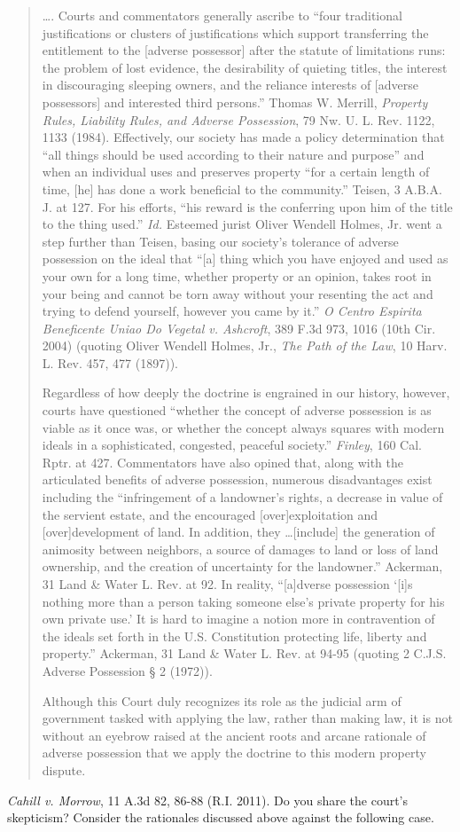 \begin{quotation}
\ldots. Courts and commentators generally ascribe to ``four traditional
justifications or clusters of justifications which support transferring the
entitlement to the [adverse possessor] after the statute of limitations runs:
the problem of lost evidence, the desirability of quieting titles, the interest
in discouraging sleeping owners, and the reliance interests of [adverse
possessors] and interested third persons.'' Thomas W. Merrill, \textit{Property
Rules, Liability Rules, and Adverse Possession}, 79 Nw. U. L. Rev. 1122, 1133
(1984). Effectively, our society has made a policy determination that ``all
things should be used according to their nature and purpose'' and when an
individual uses and preserves property ``for a certain length of time, [he] has
done a work beneficial to the community.'' Teisen, 3 A.B.A. J. at 127. For his
efforts, ``his reward is the conferring upon him of the title to the thing
used.'' \emph{Id.}
Esteemed jurist Oliver Wendell Holmes, Jr. went a step further than
Teisen, basing our society's tolerance of adverse possession on the ideal that
``[a] thing which you have enjoyed and used as your own for a long time,
whether property or an opinion, takes root in your being and cannot be torn
away without your resenting the act and trying to defend yourself, however you
came by it.'' \emph{O Centro Espirita Beneficente Uniao Do Vegetal v. Ashcroft},
389 F.3d 973, 1016 (10th Cir. 2004) (quoting Oliver Wendell Holmes, Jr.,
\textit{The Path of the Law}, 10 Harv. L. Rev. 457, 477 (1897)).

Regardless of how deeply the doctrine is engrained in our history, however,
courts have questioned ``whether the concept of adverse possession is as viable
as it once was, or whether the concept always squares with modern ideals in a
sophisticated, congested, peaceful society.'' \textit{Finley}, 160 Cal. Rptr.
at 427. Commentators have also opined that, along with the articulated benefits
of adverse possession, numerous disadvantages exist including the
``infringement of a landowner's rights, a decrease in value of the servient
estate, and the encouraged [over]exploitation and [over]development of land. In
addition, they \ldots [include] the generation of animosity between neighbors,
a source of damages to land or loss of land ownership, and the creation of
uncertainty for the landowner.'' Ackerman, 31 Land
\& Water L. Rev. at 92. In reality, ``[a]dverse possession `[i]s nothing more
than a person taking someone else's private property for his own private use.'
It is hard to imagine a notion more in contravention of the ideals set forth in
the U.S. Constitution protecting life, liberty and property.'' Ackerman, 31
Land \& Water L. Rev. at 94-95 (quoting 2 C.J.S. Adverse Possession {\S} 2
(1972)).

Although this Court duly recognizes its role as the judicial arm of government
tasked with applying the law, rather than making law, it is not without an
eyebrow raised at the ancient roots and arcane rationale of adverse possession
that we apply the doctrine to this modern property dispute.
\end{quotation}
\textit{Cahill v. Morrow}, 11 A.3d 82, 86-88 (R.I. 2011). Do you share the
court's skepticism? Consider the rationales discussed above against the
following case. 

